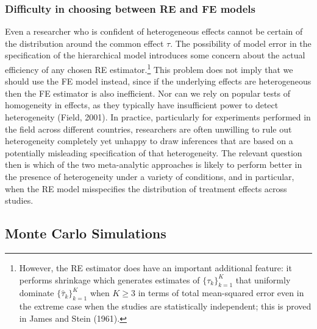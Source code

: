 \documentclass[12pt]{article}
\begin{document}
\subsubsection*{Difficulty in choosing between RE and FE models}
Even a researcher who is confident of heterogeneous effects cannot be certain of the distribution around the common effect $\tau$. The possibility of model error in the specification of the hierarchical model introduces some concern about the actual efficiency of any chosen RE estimator.\footnote{However, the RE estimator does have an important additional feature: 
it performs shrinkage which generates estimates of  $\{{\tau}_k\}_{k=1}^K$ that uniformly dominate $\{\hat{\tau}_k\}_{k=1}^K$ when $K \geq 3$ in terms of total mean-squared error even in the extreme case when the studies are statistically independent; this is proved in James and Stein (1961).} This problem does not imply that we should use the FE model instead, since if the underlying effects are heterogeneous then the FE estimator is also inefficient. Nor can we rely on popular tests of homogeneity in effects, as they typically have insufficient power to detect heterogeneity (Field, 2001). In practice, particularly for experiments performed in the field across different countries, researchers are often unwilling to rule out heterogeneity completely yet unhappy to draw inferences that are based on a potentially misleading specification of that heterogeneity. The relevant question then is which of the two meta-analytic approaches is likely to perform better in the presence of heterogeneity under a variety of conditions, and in particular, when the RE model misspecifies the distribution of treatment effects across studies.




\subsection{Monte Carlo Simulations} \label{section:simulations}


\end{document}
